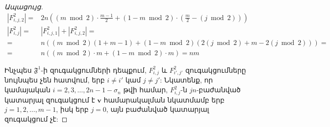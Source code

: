 \begin{proof}[Ապացույց]
\begin{align*}
|F^2_{i,j,2}| = &2n\left( (m \bmod 2)\cdot \frac{m-1}{2} + (1 - m \bmod 2)\cdot \left(\frac{m}{2} - (j \bmod 2)\right) \right) \\
|F^2_{i,j}| = &|F^2_{i,j,1}| + |F^2_{i,j,2}| =\\
= &n\left(
	(m \bmod 2)(1+m-1) + 
    (1 - m \bmod 2)(2(j \bmod 2) + m - 2(j \bmod 2))
\right) =\\
= &n\left(
	(m \bmod 2) \cdot m + 
    (1 - m \bmod 2) \cdot m
\right) = nm
\end{align*}

Ինչպես $\mathfrak{F}^1$-ի զուգակցումների դեպքում, $F^2_{i,j}$ և $F^2_{i',j'}$ զուգակցումները նույնպես չեն հատվում, երբ $i \ne i'$ կամ $j \ne j'$: Նկատենք, որ կամայական $i=2,3,\ldots,2n-1-\sigma_n$ թվի համար, $F^2_{i,j}$-ն $jn$-բաժանված կատարյալ զուգակցում է $\mathbf{v}$ համարակալման նկատմամբ երբ $j=1,2,\ldots,m-1$, իսկ երբ $j=0$, այն բաժանված կատարյալ զուգակցում չէ:


\end{proof}
